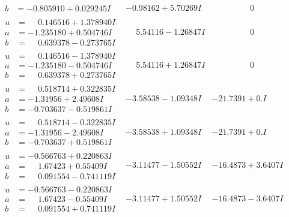 \documentclass[1p]{elsarticle_modified}
\theoremstyle{definition}
\begin{document}
$$\begin{array}{c|c|c}
\begin{aligned}
b &= -0.805910 + 0.029245 I\end{aligned}
 & -0.98162 + 5.70269 I & \phantom{-0.000000 } 0 \\ \hline\begin{aligned}
u &= \phantom{-}0.146516 + 1.378940 I \\
a &= -1.235180 + 0.504746 I \\
b &= \phantom{-}0.639378 - 0.273765 I\end{aligned}
 & \phantom{-}5.54116 - 1.26847 I & \phantom{-0.000000 } 0 \\ \hline\begin{aligned}
u &= \phantom{-}0.146516 - 1.378940 I \\
a &= -1.235180 - 0.504746 I \\
b &= \phantom{-}0.639378 + 0.273765 I\end{aligned}
 & \phantom{-}5.54116 + 1.26847 I & \phantom{-0.000000 } 0 \\ \hline\begin{aligned}
u &= \phantom{-}0.518714 + 0.322835 I \\
a &= -1.31956 + 2.49608 I \\
b &= -0.703637 - 0.519861 I\end{aligned}
 & -3.58538 - 1.09348 I & -21.7391 + 0. I\phantom{ +0.000000I} \\ \hline\begin{aligned}
u &= \phantom{-}0.518714 - 0.322835 I \\
a &= -1.31956 - 2.49608 I \\
b &= -0.703637 + 0.519861 I\end{aligned}
 & -3.58538 + 1.09348 I & -21.7391 + 0. I\phantom{ +0.000000I} \\ \hline\begin{aligned}
u &= -0.566763 + 0.220863 I \\
a &= \phantom{-}1.67423 + 0.55409 I \\
b &= \phantom{-}0.091554 - 0.741119 I\end{aligned}
 & -3.11477 - 1.50552 I & -16.4873 + 3.6407 I \\ \hline\begin{aligned}
u &= -0.566763 - 0.220863 I \\
a &= \phantom{-}1.67423 - 0.55409 I \\
b &= \phantom{-}0.091554 + 0.741119 I\end{aligned}
 & -3.11477 + 1.50552 I & -16.4873 - 3.6407 I \\ \hline\begin{aligned}

\end{aligned}
\end{array}$$
\end{document}
